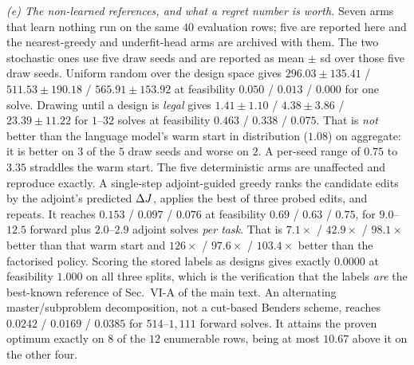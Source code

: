 \emph{(e) The non-learned references, and what a regret number is worth.}  Seven
arms that learn nothing run on the same $40$ evaluation rows; five are reported here
and the nearest-greedy and underfit-head arms are archived with them.  The two stochastic ones
use five draw seeds and are reported as mean $\pm$ sd over those five draw seeds. Uniform random over the design space gives $296.03\pm135.41$ /
$511.53\pm190.18$ / $565.91\pm153.92$ at feasibility $0.050$ / $0.013$ / $0.000$ for one
solve. Drawing until a design is \emph{legal} gives $1.41\pm1.10$ / $4.38\pm3.86$ /
$23.39\pm11.22$ for $1$--$32$ solves at feasibility $0.463$ / $0.338$ / $0.075$.  That
is \emph{not} better than the language model's warm start in distribution ($1.08$) on
aggregate: it is better on $3$ of the $5$ draw seeds and worse on $2$.  A per-seed
range of $0.75$ to $3.35$ straddles the warm start.  The five deterministic arms are unaffected and
reproduce exactly. A single-step adjoint-guided greedy ranks the candidate edits by the adjoint's
predicted $\Delta J$, applies the best of three probed edits, and repeats.  It
reaches $0.153$ / $0.097$ / $0.076$ at feasibility $0.69$ / $0.63$ / $0.75$, for
$9.0$--$12.5$ forward plus $2.0$--$2.9$ adjoint solves \emph{per task}.  That is
$7.1\times$ / $42.9\times$ / $98.1\times$ better than that warm start and $126\times$
/ $97.6\times$ / $103.4\times$ better than the factorised policy. Scoring the stored
labels as designs gives exactly $0.0000$ at feasibility $1.000$ on all three splits, which
is the verification that the labels \emph{are} the best-known reference of
Sec.~VI-A of the main text. An alternating master/subproblem decomposition, not a cut-based Benders scheme,
reaches $0.0242$ / $0.0169$ / $0.0385$ for $514$--$1{,}111$ forward solves.  It
attains the proven optimum exactly on $8$ of the $12$ enumerable rows, being at most
$10.67$ above it on the other four.

